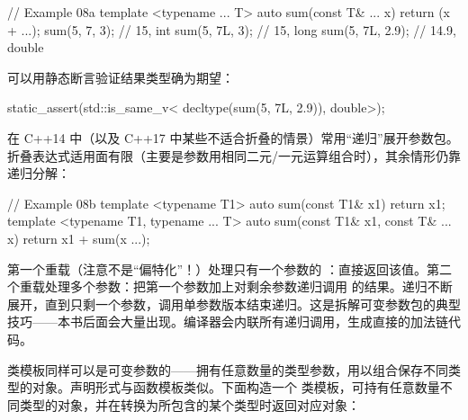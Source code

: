 \begin{code}
// Example 08a
template <typename ... T> auto sum(const T& ... x) {
  return (x + ...);
}
sum(5, 7, 3);        // 15, int
sum(5, 7L, 3);        // 15, long
sum(5, 7L, 2.9);        // 14.9, double
\end{code}

可以用静态断言验证结果类型确为期望：

\begin{code}
static_assert(std::is_same_v<
  decltype(sum(5, 7L, 2.9)), double>);
\end{code}

在 C++14 中（以及 C++17 中某些不适合折叠的情景）常用“递归”展开参数包。折叠表达式适用面有限（主要是参数用相同二元/一元运算组合时），其余情形仍靠递归分解：

\begin{code}
// Example 08b
template <typename T1> auto sum(const T1& x1) {
  return x1;
}
template <typename T1, typename ... T>
auto sum(const T1& x1, const T& ... x) {
  return x1 + sum(x ...);
}
\end{code}

第一个重载（注意不是“偏特化”！）处理只有一个参数的 ：直接返回该值。第二个重载处理多个参数：把第一个参数加上对剩余参数递归调用  的结果。递归不断展开，直到只剩一个参数，调用单参数版本结束递归。这是拆解可变参数包的典型技巧——本书后面会大量出现。编译器会内联所有递归调用，生成直接的加法链代码。

类模板同样可以是可变参数的——拥有任意数量的类型参数，用以组合保存不同类型的对象。声明形式与函数模板类似。下面构造一个  类模板，可持有任意数量不同类型的对象，并在转换为所包含的某个类型时返回对应对象：

